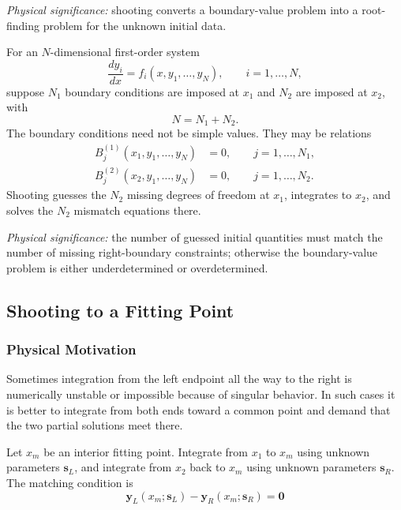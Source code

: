 \textit{Physical significance:} shooting converts a boundary-value problem
into a root-finding problem for the unknown initial data.

For an $N$-dimensional first-order system
\begin{equation}
    \frac{dy_i}{dx}
    =f_i(x,y_1,\ldots,y_N),
    \qquad i=1,\ldots,N,
    \label{eq:lec07:general-first-order-system}
\end{equation}
suppose $N_1$ boundary conditions are imposed at $x_1$ and $N_2$ are imposed
at $x_2$, with
\begin{equation}
    N=N_1+N_2.
    \label{eq:lec07:condition-count}
\end{equation}
The boundary conditions need not be simple values. They may be relations
\begin{align}
    B_j^{(1)}(x_1,y_1,\ldots,y_N)&=0,
    \qquad j=1,\ldots,N_1,
    \label{eq:lec07:left-boundary-relations}\\
    B_j^{(2)}(x_2,y_1,\ldots,y_N)&=0,
    \qquad j=1,\ldots,N_2.
    \label{eq:lec07:right-boundary-relations}
\end{align}
Shooting guesses the $N_2$ missing degrees of freedom at $x_1$, integrates
to $x_2$, and solves the $N_2$ mismatch equations there.

\textit{Physical significance:} the number of guessed initial quantities
must match the number of missing right-boundary constraints; otherwise the
boundary-value problem is either underdetermined or overdetermined.

\subsection{Shooting to a Fitting Point}\label{subsec:lec07:fitting-point}

\subsubsection*{Physical Motivation}
Sometimes integration from the left endpoint all the way to the right is
numerically unstable or impossible because of singular behavior. In such
cases it is better to integrate from both ends toward a common point and
demand that the two partial solutions meet there.

Let $x_m$ be an interior fitting point. Integrate from $x_1$ to $x_m$ using
unknown parameters $\mathbf{s}_L$, and integrate from $x_2$ back to $x_m$
using unknown parameters $\mathbf{s}_R$. The matching condition is
\begin{equation}
    \boxed{
    \mathbf{y}_L(x_m;\mathbf{s}_L)
    -\mathbf{y}_R(x_m;\mathbf{s}_R)=\mathbf{0}}
    \label{eq:lec07:fitting-condition}
\end{equation}

